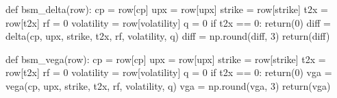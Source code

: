 \documentclass[
  letterpaper,
  DIV=11,
  numbers=noendperiod]{scrreprt}
\newenvironment{Shaded}{\begin{snugshade}}{\end{snugshade}}
\newcommand{\BuiltInTok}[1]{\textcolor[rgb]{0.00,0.23,0.31}{#1}}
\newcommand{\ControlFlowTok}[1]{\textcolor[rgb]{0.00,0.23,0.31}{#1}}
\newcommand{\DecValTok}[1]{\textcolor[rgb]{0.68,0.00,0.00}{#1}}
\newcommand{\KeywordTok}[1]{\textcolor[rgb]{0.00,0.23,0.31}{#1}}
\newcommand{\NormalTok}[1]{\textcolor[rgb]{0.00,0.23,0.31}{#1}}
\newcommand{\OperatorTok}[1]{\textcolor[rgb]{0.37,0.37,0.37}{#1}}
\newcommand{\StringTok}[1]{\textcolor[rgb]{0.13,0.47,0.30}{#1}}
\begin{document}
\begin{Shaded}
\begin{Highlighting}[]
\KeywordTok{def}\NormalTok{ bsm\_delta(row):}
\NormalTok{    cp }\OperatorTok{=}\NormalTok{ row[}\StringTok{\textquotesingle{}cp\textquotesingle{}}\NormalTok{]}
\NormalTok{    upx }\OperatorTok{=}\NormalTok{ row[}\StringTok{\textquotesingle{}upx\textquotesingle{}}\NormalTok{]}
\NormalTok{    strike }\OperatorTok{=}\NormalTok{ row[}\StringTok{\textquotesingle{}strike\textquotesingle{}}\NormalTok{]}
\NormalTok{    t2x }\OperatorTok{=}\NormalTok{ row[}\StringTok{\textquotesingle{}t2x\textquotesingle{}}\NormalTok{]}
\NormalTok{    rf }\OperatorTok{=} \DecValTok{0}
\NormalTok{    volatility }\OperatorTok{=}\NormalTok{ row[}\StringTok{\textquotesingle{}volatility\textquotesingle{}}\NormalTok{]}
\NormalTok{    q }\OperatorTok{=} \DecValTok{0}
    \ControlFlowTok{if}\NormalTok{ t2x }\OperatorTok{==} \DecValTok{0}\NormalTok{:}
        \ControlFlowTok{return}\NormalTok{(}\DecValTok{0}\NormalTok{)}
\NormalTok{    diff }\OperatorTok{=}\NormalTok{ delta(cp, upx, strike, t2x, rf, volatility, q)}
\NormalTok{    diff }\OperatorTok{=}\NormalTok{ np.}\BuiltInTok{round}\NormalTok{(diff, }\DecValTok{3}\NormalTok{)}
    \ControlFlowTok{return}\NormalTok{(diff)}
\end{Highlighting}
\end{Shaded}

\begin{Shaded}
\begin{Highlighting}[]
\KeywordTok{def}\NormalTok{ bsm\_vega(row):}
\NormalTok{    cp }\OperatorTok{=}\NormalTok{ row[}\StringTok{\textquotesingle{}cp\textquotesingle{}}\NormalTok{]}
\NormalTok{    upx }\OperatorTok{=}\NormalTok{ row[}\StringTok{\textquotesingle{}upx\textquotesingle{}}\NormalTok{]}
\NormalTok{    strike }\OperatorTok{=}\NormalTok{ row[}\StringTok{\textquotesingle{}strike\textquotesingle{}}\NormalTok{]}
\NormalTok{    t2x }\OperatorTok{=}\NormalTok{ row[}\StringTok{\textquotesingle{}t2x\textquotesingle{}}\NormalTok{]}
\NormalTok{    rf }\OperatorTok{=} \DecValTok{0}
\NormalTok{    volatility }\OperatorTok{=}\NormalTok{ row[}\StringTok{\textquotesingle{}volatility\textquotesingle{}}\NormalTok{]}
\NormalTok{    q }\OperatorTok{=} \DecValTok{0}
    \ControlFlowTok{if}\NormalTok{ t2x }\OperatorTok{==} \DecValTok{0}\NormalTok{:}
        \ControlFlowTok{return}\NormalTok{(}\DecValTok{0}\NormalTok{)}
\NormalTok{    vga }\OperatorTok{=}\NormalTok{ vega(cp, upx, strike, t2x, rf, volatility, q)}
\NormalTok{    vga }\OperatorTok{=}\NormalTok{ np.}\BuiltInTok{round}\NormalTok{(vga, }\DecValTok{3}\NormalTok{)}
    \ControlFlowTok{return}\NormalTok{(vga)}
\end{Highlighting}
\end{Shaded}
\end{document}
